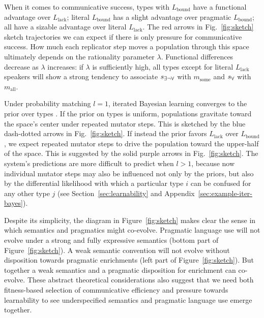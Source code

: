 \documentclass[a4paper, 11pt]{article}
\theoremstyle{Satz}
\newcommand{\state}{\ensuremath{s}\xspace}		%
\newcommand{\mystate}[1]{\ensuremath{\state_{\text{#1}}}\xspace} %
\newcommand{\mylang}[1]{\ensuremath{L_{\text{#1}}}\xspace} %
\newcommand{\messg}{\ensuremath{m}\xspace}		%
\newcommand{\mymessg}[1]{\ensuremath{\messg_{\text{#1}}}\xspace} %
\newcommand{\ssome}{\mystate{\ensuremath{\exists\neg\forall}}}
\newcommand{\sall}{\mystate{\ensuremath{\forall}}}
\newcommand{\msome}{\mymessg{some}}
\newcommand{\mall}{\mymessg{all}}
\newcommand{\Lbound}{\mylang{bound}}
\newcommand{\Llack}{\mylang{lack}}
\begin{document}
When it comes to communicative success, types with $\Lbound$ have a functional advantage over
$\Llack$; literal $\Lbound$ has a slight advantage over pragmatic $\Lbound$; all have a sizable
advantage over literal $\Llack$. The red arrows in Fig.~\ref{fig:sketch} sketch trajectories we
can expect if there is only pressure for communicative success. How much each replicator step
moves a population through this space ultimately depends on the rationality parameter
$\lambda$. Functional differences decrease as $\lambda$ increases: if $\lambda$ is sufficiently
high, all types except for literal $\Llack$ speakers will show a strong tendency to associate
$\ssome$ with $\msome$ and $\sall$ with $\mall$.

Under probability matching $l=1$, iterated Bayesian learning converges to the prior over types
\citep{griffiths+kalish:2007}. If the prior on types is uniform, populations gravitate toward
the space's center under repeated mutator steps. This is sketched by the blue dash-dotted
arrows in Fig.~\ref{fig:sketch}. If instead the prior favors $\Llack$ over $\Lbound$, we expect
repeated mutator steps to drive the population toward the upper-half of the space. This is
suggested by the solid purple arrows in Fig.~\ref{fig:sketch}. The system's predictions are
more difficult to predict when $l>1$, because now individual mutator steps may also be
influenced not only by the priors, but also by the differential likelihood with which a
particular type $i$ can be confused for any other type $j$ (see Section~\ref{sec:learnability}
and Appendix~\ref{sec:example-iter-bayes}).

Despite its simplicity, the diagram in Figure~\ref{fig:sketch} makes clear the sense in which
semantics and pragmatics might co-evolve. Pragmatic language use will not evolve under a strong
and fully expressive semantics (bottom part of Figure~\ref{fig:sketch}). A weak semantic
convention will not evolve without disposition towards pragmatic enrichments (left part of
Figure~\ref{fig:sketch}). But together a weak semantics and a pragmatic disposition for
enrichment can co-evolve. These abstract theoretical considerations also suggest that we need
both fitness-based selection of communicative efficiency and pressure towards learnability to
see underspecified semantics and pragmatic language use emerge together.
\end{document}
